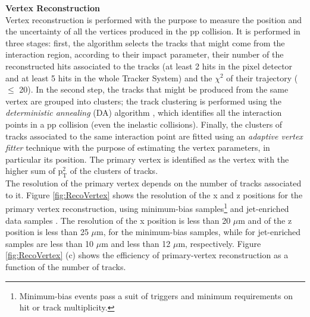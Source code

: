 \textbf{Vertex Reconstruction}\\

\noindent Vertex reconstruction is performed with the purpose to measure the position and the uncertainty
of all the vertices produced in the pp collision. It is performed in three stages: first, the 
algorithm selects the tracks that might come from the interaction region, according to 
their impact parameter, their number of the reconstructed hits associated
to the tracks (at least 2 hits in the pixel detector and at least 5 hits in the whole Tracker System) 
and the $\chi^{2}$ of their trajectory ($\leq $ 20). In the second step, the tracks
that might be produced from the same vertex are grouped into clusters; the track clustering 
is performed using the \textit{deterministic annealing} (DA) algorithm \cite{DAnnealing}, which 
identifies all the interaction points in a pp collision (even the inelastic collisions). Finally, 
the clusters of tracks associated to the same interaction point are fitted using an
\textit{adaptive vertex fitter} technique \cite{AdaptiveVertexFitting} with the purpose 
of estimating the vertex parameters, in particular its position. The primary vertex is identified
as the vertex with the higher sum of $\textrm{p}_{\textrm{T}}^{2}$ of the clusters of tracks.\\

\noindent The resolution of the primary vertex depends on the number of tracks associated to it. Figure \ref{fig:RecoVertex} 
shows the resolution of the x and z positions for the primary vertex reconstruction, using minimum-bias 
samples\footnote{Minimum-bias events pass a suit of triggers and minimum requirements on hit 
or track multiplicity.} and jet-enriched data samples \cite{TrackAndVertexReconstruction}. The resolution 
of the x position is less than 20 $\mu$m and of the z position is less than 25 $\mu$m, for the 
minimum-bias samples, while for jet-enriched samples are less than 10 $\mu$m and less than 
12 $\mu$m, respectively. Figure \ref{fig:RecoVertex} (c) shows
the efficiency of primary-vertex reconstruction as a function of the number of tracks. 


